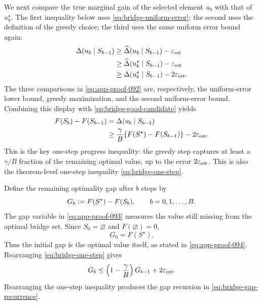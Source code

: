 \documentclass[11pt]{article}
\numberwithin{equation}{section}
\newcommand{\1}{\mathbf 1}
\newcommand{\defeq}{\vcentcolon=}
\newcommand{\eps}{\varepsilon}
\begin{document}
We next compare the true marginal gain of the selected element \(u_b\)
with that of \(u_b^\star\).  The first inequality below uses
\eqref{eq:bridge-uniform-error}; the second uses the definition of the
greedy choice; the third uses the same uniform error bound again:
\begin{equation}
\label{eq:app-proof-092}
\begin{aligned}
  \Delta(u_b\mid S_{b-1})
  &\ge
  \widehat\Delta(u_b\mid S_{b-1})-\eps_{\rm est} \\
  &\ge
  \widehat\Delta(u_b^\star\mid S_{b-1})-\eps_{\rm est} \\
  &\ge
  \Delta(u_b^\star\mid S_{b-1})-2\eps_{\rm est}.
\end{aligned}
\end{equation}
The three comparisons in \eqref{eq:app-proof-092} are, respectively, the
uniform-error lower bound, greedy maximization, and the second uniform-error
bound.
Combining this display with \eqref{eq:bridge-good-candidate} yields
\begin{equation}
\begin{aligned}
  F(S_b)-F(S_{b-1})
  &=
  \Delta(u_b\mid S_{b-1}) \\
  &\ge
  \frac{\gamma}{B}
  \{F(S^\star)-F(S_{b-1})\}
  -
  2\eps_{\rm est}.
\end{aligned}
\label{eq:bridge-one-step}
\end{equation}
This is the key one-step progress inequality: the greedy step captures at
least a \(\gamma/B\) fraction of the remaining optimal value, up to the
error \(2\eps_{\rm est}\).
This is also the theorem-level one-step inequality
\eqref{eq:bridge-one-step}.

Define the remaining optimality gap after \(b\) steps by
\begin{equation}
\label{eq:app-proof-093}
G_b\defeq F(S^\star)-F(S_b),
  \qquad b=0,1,\ldots,B.
\end{equation}
The gap variable in \eqref{eq:app-proof-093} measures the value still missing
from the optimal bridge set.
Since \(S_0=\varnothing\) and \(F(\varnothing)=0\),
\begin{equation}
\label{eq:app-proof-094}
G_0=F(S^\star).
\end{equation}
Thus the initial gap is the optimal value itself, as stated in
\eqref{eq:app-proof-094}.
Rearranging \eqref{eq:bridge-one-step} gives
\begin{equation}
  G_b
  \le
  \left(1-\frac{\gamma}{B}\right)G_{b-1}
  +
  2\eps_{\rm est}.
  \label{eq:bridge-gap-recurrence}
\end{equation}
Rearranging the one-step inequality produces the gap recursion in
\eqref{eq:bridge-gap-recurrence}.
\end{document}
